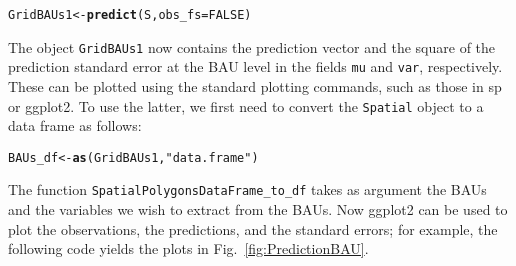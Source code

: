 \documentclass{article}\usepackage[]{graphicx}\usepackage[]{color}
\makeatletter
\newcommand{\hlnum}[1]{\textcolor[rgb]{0.686,0.059,0.569}{#1}}%
\newcommand{\hlstr}[1]{\textcolor[rgb]{0.192,0.494,0.8}{#1}}%
\newcommand{\hlstd}[1]{\textcolor[rgb]{0.345,0.345,0.345}{#1}}%
\newcommand{\hlkwb}[1]{\textcolor[rgb]{0.69,0.353,0.396}{#1}}%
\newcommand{\hlkwc}[1]{\textcolor[rgb]{0.333,0.667,0.333}{#1}}%
\newcommand{\hlkwd}[1]{\textcolor[rgb]{0.737,0.353,0.396}{\textbf{#1}}}%
\newenvironment{kframe}{%
 \def\at@end@of@kframe{}%
 \ifinner\ifhmode%
  \def\at@end@of@kframe{\end{minipage}}%
  \begin{minipage}{\columnwidth}%
 \fi\fi%
 \def\FrameCommand##1{\hskip\@totalleftmargin \hskip-\fboxsep
 \colorbox{shadecolor}{##1}\hskip-\fboxsep
     \hskip-\linewidth \hskip-\@totalleftmargin \hskip\columnwidth}%
 \MakeFramed {\advance\hsize-\width
   \@totalleftmargin\z@ \linewidth\hsize
   \@setminipage}}%
 {\par\unskip\endMakeFramed%
 \at@end@of@kframe}
\newenvironment{knitrout}{}{} %
\renewcommand{\tt} {\texttt}
\newcommand{\pkg}[1]{{\fontseries{b}\selectfont #1}}
\makeatother
\begin{document}
\begin{knitrout}
\color{fgcolor}\begin{kframe}
\begin{alltt}
\hlstd{GridBAUs1} \hlkwb{<-} \hlkwd{predict}\hlstd{(S,} \hlkwc{obs_fs} \hlstd{=} \hlnum{FALSE}\hlstd{)}
\end{alltt}
\end{kframe}
\end{knitrout}

\noindent The object \tt{GridBAUs1} now contains the prediction vector and the square of the prediction standard error at the BAU level in the fields \tt{mu} and \tt{var}, respectively. These can be plotted using the standard plotting commands, such as those in \pkg{sp} or \pkg{ggplot2}. To use the latter, we first need to convert the \tt{Spatial} object to a data frame as follows:

\begin{knitrout}
\color{fgcolor}\begin{kframe}
\begin{alltt}
\hlstd{BAUs_df} \hlkwb{<-} \hlkwd{as}\hlstd{(GridBAUs1,}\hlstr{"data.frame"}\hlstd{)}
\end{alltt}
\end{kframe}
\end{knitrout}


\noindent The function \tt{SpatialPolygonsDataFrame\_to\_df} takes as argument the BAUs and the variables we wish to extract from the BAUs. Now \pkg{ggplot2} can be used to plot the observations, the predictions, and the standard errors; for example, the following code yields the plots in Fig.~\ref{fig:PredictionBAU}.
\end{document}
